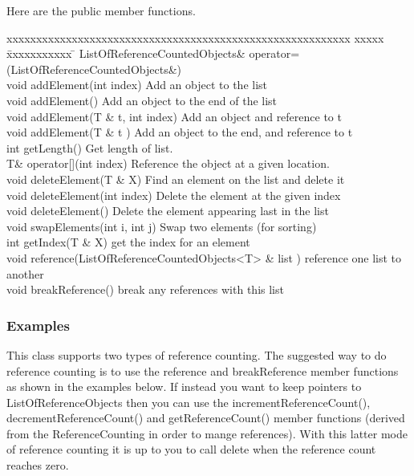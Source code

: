 \noindent
Here are the public member functions. 
\begin{tabbing}
{\ff xxxxxxxxxxxxxxxxxxxxxxxxxxxxxxxxxxxxxxxxxxxxxxxxxxxxxxxxxx} xxxxx \= xxxxxxxxxxx \=  \kill
{\ff ListOfReferenceCountedObjects\& operator=(ListOfReferenceCountedObjects\&)} \> \\
{\ff void addElement(int index)} \> Add an object to the list \\
{\ff void addElement()} \> Add an object to the end of the list \\
{\ff void addElement(T \& t, int index)} \> Add an object and reference to  t \\
{\ff void addElement(T \& t )} \> Add an object to the end, and reference to t \\
{\ff int getLength()} \> Get length of list. \\
{\ff T\& operator[](int index)} \>  Reference the object at a given location. \\
{\ff void deleteElement(T \& X)} \> Find an element on the list and delete it \\
{\ff void deleteElement(int index)} \> Delete the element at the given index \\
{\ff void deleteElement()} \> Delete the element appearing last in the list   \\
{\ff void swapElements(int i, int j)} \>  Swap two elements (for sorting) \\
{\ff int getIndex(T \& X)} \> get the index for an element \\
{\ff void reference(ListOfReferenceCountedObjects<T> \& list )} \> reference one list to another \\
{\ff void breakReference()} \> break any references with this list 
\end{tabbing}


\subsubsection{Examples}

This class supports two types of reference counting. The suggested
way to do reference counting is to use the reference and breakReference
member functions as shown in the examples below. If instead you want
to keep pointers to ListOfReferenceObjects then you can use the
incrementReferenceCount(), decrementReferenceCount() and
getReferenceCount() member functions (derived from the ReferenceCounting
in order to mange references). With this latter mode of reference
counting it is up to you to call delete when
the reference count reaches zero.

